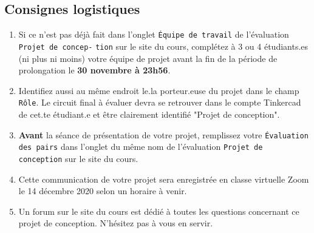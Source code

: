 \documentclass[english,french,12pt]{article}
\begin{document}
\subsection*{Consignes logistiques}
\begin{enumerate}
    \item Si ce n'est pas déjà fait dans l'onglet \texttt{Équipe de travail} de l'évaluation \texttt{Projet de concep-} \texttt{tion} sur le site du cours, complétez à 3 ou 4 étudiants.es (ni plus ni moins) votre équipe de projet avant la fin de la période de prolongation le \textbf{30 novembre à 23h56}.
    \item Identifiez aussi au même endroit le.la porteur.euse du projet dans le champ \texttt{Rôle}. Le circuit final à évaluer devra se retrouver dans le compte Tinkercad de cet.te étudiant.e et être clairement identifié "Projet de conception".
    \item \textbf{Avant} la séance de présentation de votre projet, remplissez votre \texttt{Évaluation des pairs} dans l'onglet du même nom de l'évaluation \texttt{Projet de conception} sur le site du cours.
    \item Cette communication de votre projet sera enregistrée en classe virtuelle Zoom le 14 décembre 2020 selon un horaire à venir.
    \item Un forum sur le site du cours est dédié à toutes les questions concernant ce projet de conception. N’hésitez pas à vous en servir. 
\end{enumerate}
\end{document}
